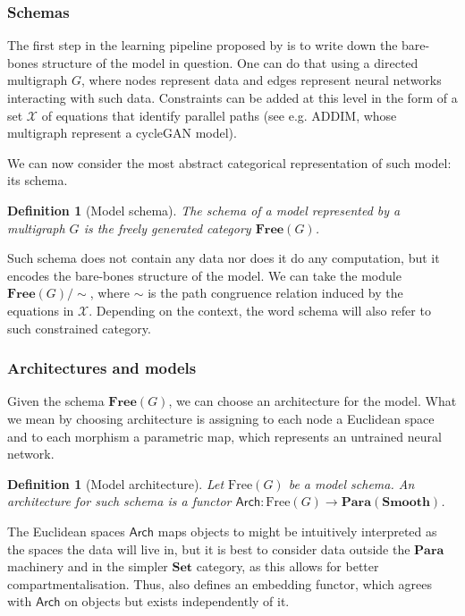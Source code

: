 \documentclass[11pt,a4paper,openright,twoside]{report}
\theoremstyle{plain}
\newtheorem{definition}[proposition]{Definition}
\theoremstyle{definition}
\begin{document}
\subsubsection{Schemas}

The first step in the learning pipeline proposed by \cite{gavranovicLearningFunctorsUsing2020} is to write down the bare-bones structure of the model in question. One can do that using a directed multigraph $G$, where nodes represent data and edges represent neural networks interacting with such data. Constraints can be added at this level in the form of a set $\mathcal{X}$ of equations that identify parallel paths (see e.g. ADDIM, whose multigraph represent a cycleGAN model).


We can now consider the most abstract categorical representation of such model: its schema. 

\begin{definition}[Model schema]
  The schema of a model represented by a multigraph $G$ is the freely generated category $\mathbf{Free}(G)$.
\end{definition}

Such schema does not contain any data nor does it do any computation, but it encodes the bare-bones structure of the model. We can take the module $\mathbf{Free}(G)/{\sim}$, where ${\sim}$ is the path congruence relation induced by the equations in $\mathcal{X}$. Depending on the context, the word schema will also refer to such constrained category.

\subsubsection{Architectures and models}


Given the schema $\mathbf{Free}(G)$, we can choose an architecture for the model. What we mean by choosing architecture is assigning to each node a Euclidean space and to each morphism a parametric map, which represents an untrained neural network.

\begin{definition}[Model architecture]
  Let $\mathrm{Free}(G)$ be a model schema. An architecture for such schema is a functor $\mathsf{Arch}: \mathrm{Free}(G) \to \mathbf{Para}(\mathbf{Smooth})$.
\end{definition}

The Euclidean spaces $\mathsf{Arch}$ maps objects to might be intuitively interpreted as the spaces the data will live in, but it is best to consider data outside the $\mathbf{Para}$ machinery and in the simpler $\mathbf{Set}$ category, as this allows for better compartmentalisation. Thus, \cite{gavranovicLearningFunctorsUsing2020} also defines an embedding functor, which agrees with $\mathsf{Arch}$ on objects but exists independently of it.
\end{document}
